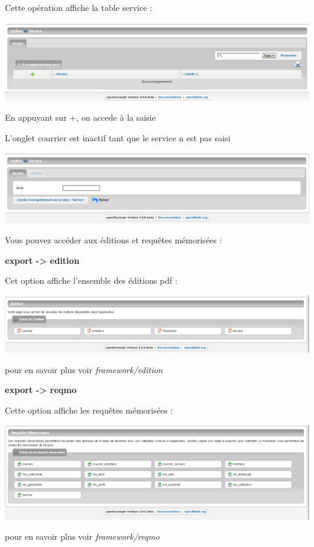 \documentclass[letterpaper,10pt,french]{manual}
\begin{document}
Cette opération affiche la table service :

\includegraphics{utilisation_7.png}

En appuyant sur +, on accede à la saisie

L'onglet courrier est inactif tant que le service n est pas saisi

\includegraphics{utilisation_8.png}

Vous pouvez accéder aux éditions et requêtes mémorisées :

\textbf{export -\textgreater{} edition}

Cet option affiche l'ensemble des éditions pdf :

\includegraphics{utilisation_9.png}

pour en savoir plus voir \emph{framework/edition}

\textbf{export -\textgreater{} reqmo}

Cette option affiche les requêtes mémorisées :

\includegraphics{utilisation_10.png}

pour en savoir plus voir \emph{framework/reqmo}
\end{document}
